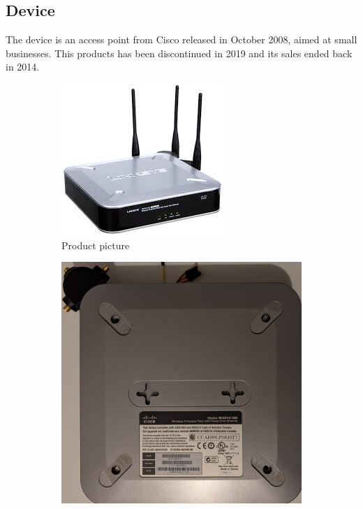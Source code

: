 \documentclass{article}
\begin{document}
\subsection{Device}
The device is an access point from Cisco released in October 2008, aimed at small businesses. This products has been discontinued in 2019 and its sales ended back in 2014.
\begin{figure}[!h]
	\centering
	\begin{subfigure}{0.3\textwidth}
		\includegraphics[width=\textwidth]{AP.jpg}
		\caption{Product picture}
		\label{outside}
	\end{subfigure}
	\begin{subfigure}{0.3\textwidth}
		\includegraphics[width=\textwidth]{bottom.jpg}

\end{subfigure}
\end{figure}
\end{document}
